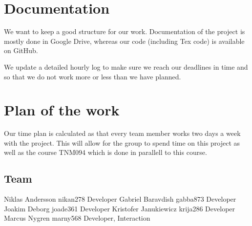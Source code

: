 \documentclass[a4paper,12pt,twoside,swedish]{report}
\begin{document}
\section{Documentation}
We want to keep a good structure for our work. Documentation of the project is mostly done in Google Drive, whereas our code (including Tex code) is available on GitHub.

We update a detailed hourly log to make sure we reach our deadlines in time and so that we do not work more or less than we have planned.

\section{Plan of the work}
Our time plan is calculated as that every team member works two days a week with the project. This will allow for the group to spend time on this project as well as the course TNM094 which is done in parallell to this course.

 \subsection{Team}
Niklas Andersson	nikan278	Developer
Gabriel Baravdish	gabba873	Developer
Joakim Deborg	joade361	Developer
Kristofer Janukiewicz	krija286	Developer
Marcus Nygren	marny568	Developer, Interaction
\end{document}
